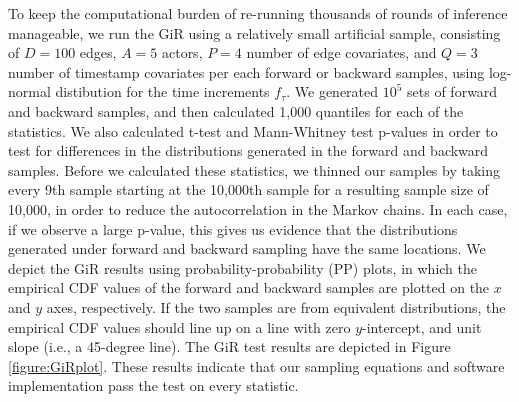 \documentclass[ba]{imsart}
\numberwithin{equation}{section}
\theoremstyle{plain}
\begin{document}
	To keep the computational burden of re-running thousands of rounds of inference manageable, we run the GiR using a relatively small artificial sample, consisting of $D=100$ edges, $A=5$ actors, $P=4$ number of edge covariates, and $Q=3$ number of timestamp covariates per each forward or backward samples, using log-normal distibution for the time increments $f_\tau$. We generated $10^5$ sets of forward and backward samples, and then calculated 1,000 quantiles for each of the statistics. We also calculated t-test and Mann-Whitney test p-values in order to test for differences in the distributions generated in the forward and backward samples. Before we calculated these statistics, we thinned our samples by taking every 9th sample starting at the 10,000th sample for a resulting sample size of 10,000, in order to reduce the autocorrelation in the Markov chains. In each case, if we observe a large p-value, this gives us evidence that the distributions generated under forward and backward sampling have the same locations. We depict the GiR results using probability-probability (PP) plots, in which the empirical CDF values of the forward and backward samples are plotted on the $x$ and $y$ axes, respectively. If the two samples are from equivalent distributions, the empirical CDF values should line up on a line with zero $y$-intercept, and unit slope (i.e., a 45-degree line). The GiR test results are depicted in Figure \ref{figure:GiRplot}. These results indicate that our sampling equations and software implementation pass the test on every statistic.
\end{document}
